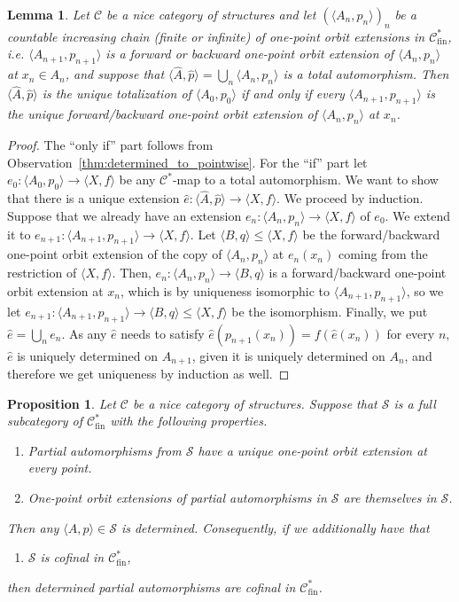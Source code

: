 \documentclass[10pt,a4paper]{article}
\newtheorem{lm}[tw]{Lemma}
\newtheorem{prop}[tw]{Proposition}
\theoremstyle{definition}
\theoremstyle{remark}
\newcommand \seq [1]{\langle #1 \rangle}
\newcommand \maps {\colon} %
\newcommand \Su {\mathscr{S}}
\newcommand \C {\mathscr{C}}
\newcommand \fin {{\operatorname{fin}}}
\begin{document}
\begin{lm} \label{thm:pointwise_determined}
    Let $\C$ be a nice category of structures and let $(\seq{A_n, p_n})_n$ be a countable increasing chain (finite or infinite) of one-point orbit extensions in $\C^*_\fin$, i.e. $\seq{A_{n+1}, p_{n+1}}$ is a forward or backward one-point orbit extension of $\seq{A_n, p_n}$ at $x_n \in A_n$, and suppose that $\seq{\hat{A}, \hat{p}} = \bigcup_n \seq{A_n, p_n}$ is a total automorphism.
    Then $\seq{\hat{A}, \hat{p}}$ is the unique totalization of $\seq{A_0, p_0}$ if and only if every $\seq{A_{n + 1}, p_{n + 1}}$ is the unique forward/backward one-point orbit extension of $\seq{A_n, p_n}$ at $x_n$.
\end{lm}
\begin{proof}
    The ``only if'' part follows from Observation~\ref{thm:determined_to_pointwise}.
    For the ``if'' part let $e_0\maps \seq{A_0, p_0} \to \seq{X, f}$ be any $\C^*$-map to a total automorphism.
    We want to show that there is a unique extension $\hat{e}\maps \seq{\hat{A}, \hat{p}} \to \seq{X, f}$.
    We proceed by induction.
    Suppose that we already have an extension $e_n\maps \seq{A_n, p_n} \to \seq{X, f}$ of $e_0$.
    We extend it to $e_{n + 1}\maps \seq{A_{n + 1}, p_{n + 1}} \to \seq{X, f}$.
    Let $\seq{B, q} \leq \seq{X, f}$ be the forward/backward one-point orbit extension of the copy of $\seq{A_n, p_n}$ at $e_n(x_n)$ coming from the restriction of $\seq{X, f}$.
    Then, $e_n\maps \seq{A_n, p_n} \to \seq{B, q}$ is a forward/backward one-point orbit extension at $x_n$, which is by uniqueness isomorphic to $\seq{A_{n+1}, p_{n+1}}$, so we let $e_{n + 1}\maps \seq{A_{n + 1}, p_{n + 1}} \to \seq{B, q} \leq \seq{X, f}$ be the isomorphism.
    Finally, we put $\hat{e} = \bigcup_n e_n$.
    As any $\hat{e}$ needs to satisfy $\hat{e}(p_{n + 1}(x_n)) = f(\hat{e}(x_n))$ for every $n$, $\hat{e}$ is uniquely determined on $A_{n + 1}$, given it is uniquely determined on $A_n$, and therefore we get uniqueness by induction as well.
\end{proof}

\color{black}






\begin{prop}\label{prop: suffimpldeterm}
    Let $\C$ be a nice category of structures.
    Suppose that $\Su$ is a full subcategory of $\C^*_\fin$ with the following properties.
     \begin{enumerate}
        \item Partial automorphisms from $\Su$ have a unique one-point orbit extension at every point.
        \item One-point orbit extensions of partial automorphisms in $\Su$ are themselves in $\Su$.
    \end{enumerate}
    Then any $\seq{A, p}\in\Su$ is determined. 
    Consequently, if we additionally have that
    \begin{enumerate}[resume]
        \item $\Su$ is cofinal in $\C^*_\fin$,
    \end{enumerate}
    then determined partial automorphisms are cofinal in $\C^*_\fin$.
\end{prop}
\end{document}
